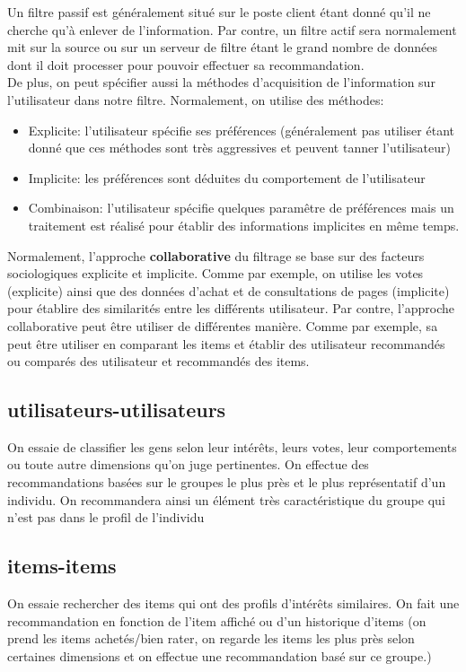 \documentclass[oneside]{book}
\begin{document}
Un filtre passif est généralement situé sur le poste client étant donné qu'il ne cherche qu'à enlever de l'information. Par contre, un filtre actif sera normalement mit sur la source ou sur un serveur de filtre étant le grand nombre de données dont il doit processer pour pouvoir effectuer sa recommandation.\\

De plus, on peut spécifier aussi la méthodes d'acquisition de l'information sur l'utilisateur dans notre filtre. Normalement, on utilise des méthodes:
\begin{itemize}
\item Explicite: l'utilisateur spécifie ses préférences (généralement pas utiliser étant donné que ces méthodes sont très aggressives et peuvent tanner l'utilisateur)
\item Implicite: les préférences sont déduites du comportement de l'utilisateur
\item Combinaison: l'utilisateur spécifie quelques paramêtre de préférences mais un traitement est réalisé pour établir des informations implicites en même temps.
\end{itemize}

Normalement, l'approche \textbf{collaborative} du filtrage se base sur des facteurs sociologiques explicite et implicite. Comme par exemple, on utilise les votes (explicite) ainsi que des données d'achat et de consultations de pages (implicite) pour établire des similarités entre les différents utilisateur. Par contre, l'approche collaborative peut être utiliser de différentes manière. Comme par exemple, sa peut être utiliser en comparant les items et établir des utilisateur recommandés ou comparés des utilisateur et recommandés des items. 
\subsection{utilisateurs-utilisateurs}
On essaie de classifier les gens selon leur intérêts, leurs votes, leur comportements ou toute autre dimensions qu'on juge pertinentes. On effectue des recommandations basées sur le groupes le plus près et le plus représentatif d'un individu. On recommandera ainsi un élément très caractéristique du groupe qui n'est pas dans le profil de l'individu
\subsection{items-items}
On essaie rechercher des items qui ont des profils d'intérêts similaires. On fait une recommandation en fonction de l'item affiché ou d'un historique d'items (on prend les items achetés/bien rater, on regarde les items les plus près selon certaines dimensions et on effectue une recommandation basé sur ce groupe.) 
\end{document}
